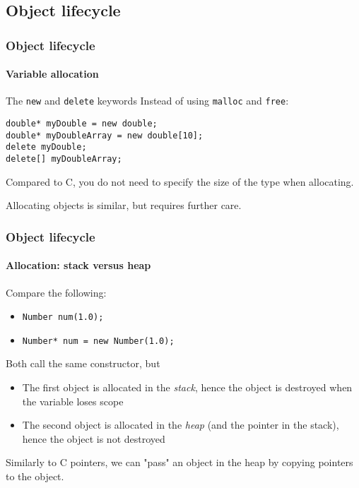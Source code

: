\subsection{Object lifecycle}

\begin{frame}[fragile]
\frametitle{Object lifecycle}
\framesubtitle{Variable allocation}

\begin{block}{The \texttt{new} and \texttt{delete} keywords}
Instead of using \texttt{malloc} and \texttt{free}:

\begin{verbatim}
double* myDouble = new double;
double* myDoubleArray = new double[10];
delete myDouble;
delete[] myDoubleArray;
\end{verbatim}
Compared to C, you do not need to specify the size of the type when allocating.

Allocating objects is similar, but requires further care.
\end{block}

\end{frame}

\begin{frame}
\frametitle{Object lifecycle}
\framesubtitle{Allocation: stack versus heap}

\begin{block}{Compare the following:}
\begin{itemize}
\item \texttt{Number num(1.0); }
\item \texttt{Number* num = new Number(1.0); }
\end{itemize}
Both call the same constructor, but
\begin{itemize}
\item The first object is allocated in the {\em stack}, hence the object is destroyed when the variable loses scope
\item The second object is allocated in the {\em heap} (and the pointer in the stack), hence the object is not destroyed
\end{itemize}
Similarly to C pointers, we can "pass" an object in the heap by copying pointers to the object.
\end{block}

\end{frame}


